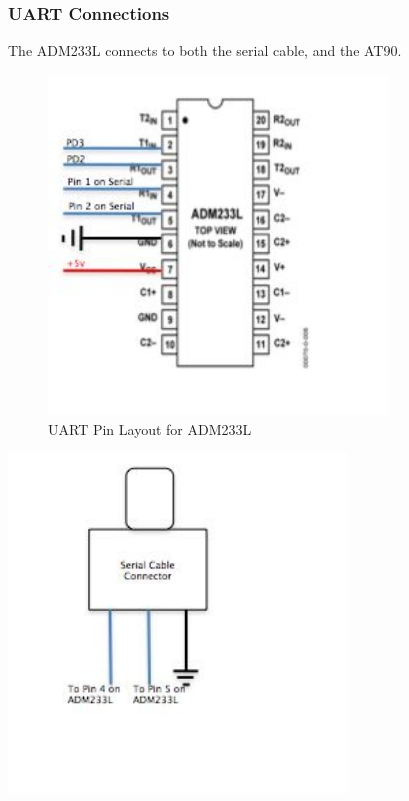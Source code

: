 \subsubsection{UART Connections}
The ADM233L connects to both the serial cable, and the AT90. 
\begin{figure}[h]
  \begin{center}
    \includegraphics[width=90mm]{imageSources/uartConnect1.png}
  \end{center}
  \caption{UART Pin Layout for ADM233L} 
  \label{uartConnect1}
\end{figure}


  \begin{center}
    \includegraphics[width=90mm]{imageSources/uartConnect2.png}
  \end{center}
  \label{uartConnect2}



